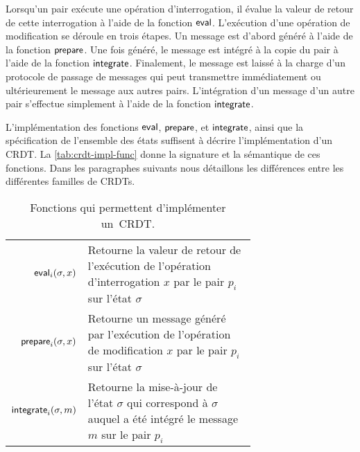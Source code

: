 Lorsqu'un pair exécute une opération d'interrogation, il évalue la valeur de retour de cette interrogation à l'aide de la fonction $\operatorname{\mathsf{eval}}$.
L'exécution d'une opération de modification se déroule en trois étapes.
Un message est d'abord généré à l'aide de la fonction $\operatorname{\mathsf{prepare}}$.
Une fois généré, le message est intégré à la copie du pair à l'aide de la fonction $\operatorname{\mathsf{integrate}}$.
Finalement, le message est laissé à la charge d'un protocole de passage de messages qui peut transmettre immédiatement ou ultérieurement le message aux autres pairs.
L'intégration d'un message d'un autre pair s'effectue simplement à l'aide de la fonction $\operatorname{\mathsf{integrate}}$.

L'implémentation des fonctions $\operatorname{\mathsf{eval}}$, $\operatorname{\mathsf{prepare}}$, et $\operatorname{\mathsf{integrate}}$, ainsi que la spécification de l'ensemble des états suffisent à décrire l'implémentation d'un \ac{CRDT}.
La \autoref{tab:crdt-impl-func} donne la signature et la sémantique de ces fonctions.
Dans les paragraphes suivants nous détaillons les différences entre les différentes familles de \acp{CRDT}.

\begin{table}[htb]
\centering
\begin{tabular}{rp{0.7\linewidth}}
    $\operatorname{\mathsf{eval}}_i(\sigma, x)$ & Retourne la valeur de retour de l'exécution de l'opération d'interrogation $x$ par le pair $p_i$ sur l'état $\sigma$ \\
    $\operatorname{\mathsf{prepare}}_i(\sigma, x)$ & Retourne un message généré par l'exécution de l'opération de modification $x$ par le pair $p_i$ sur l'état $\sigma$ \\
    $\operatorname{\mathsf{integrate}}_i(\sigma, m)$ & Retourne la mise-à-jour de l'état $\sigma$ qui correspond à $\sigma$ auquel a été intégré le message $m$ sur le pair $p_i$\\
\end{tabular}
\caption[Fonctions qui permettent d'implémenter un~\ac{CRDT}]{Fonctions qui permettent d'implémenter un~\ac{CRDT}.}\label{tab:crdt-impl-func}
\end{table}

